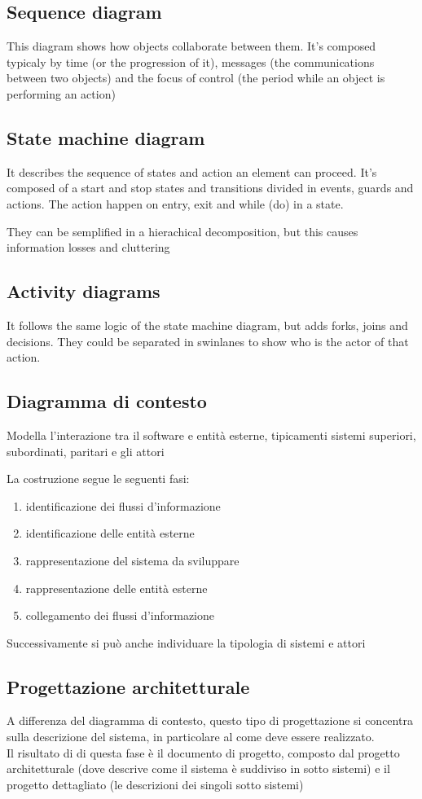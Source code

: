 \documentclass[12pt, a4paper]{article}
\begin{document}
\subsection{Sequence diagram}
This diagram shows how objects collaborate between them. It's composed typicaly by time (or the progression of it), 
messages (the communications between two objects) and the focus of control (the period while an object is performing an
action)

\subsection{State machine diagram}
It describes the sequence of states and action an element can proceed. It's composed of a start and stop states and
transitions divided in events, guards and actions. The action happen on entry, exit and while (do) in a state.

They can be semplified in a hierachical decomposition, but this causes information losses and cluttering

\subsection{Activity diagrams}
It follows the same logic of the state machine diagram, but adds forks, joins and decisions. They could be
separated in swinlanes to show who is the actor of that action.

\subsection{Diagramma di contesto}
Modella l'interazione tra il software e entità esterne, tipicamenti sistemi superiori, subordinati, paritari e
gli attori

La costruzione segue le seguenti fasi:
\begin{enumerate}
    \item identificazione dei flussi d'informazione
    \item identificazione delle entità esterne
    \item rappresentazione del sistema da sviluppare
    \item rappresentazione delle entità esterne
    \item collegamento dei flussi d'informazione
\end{enumerate}
Successivamente si può anche individuare la tipologia di sistemi e attori


\subsection{Progettazione architetturale}
A differenza del diagramma di contesto, questo tipo di progettazione si concentra sulla descrizione del 
sistema, in particolare al come deve essere realizzato.\\Il risultato di di questa fase è il documento di 
progetto, composto dal progetto architetturale (dove descrive come il sistema è suddiviso in sotto sistemi)
e il progetto dettagliato (le descrizioni dei singoli sotto sistemi)
\end{document}
